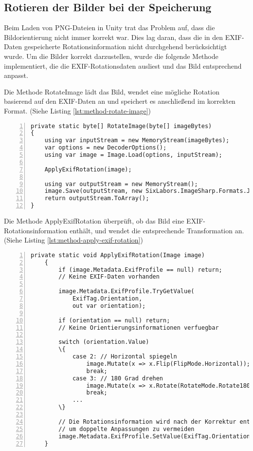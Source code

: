 \subsection{Rotieren der Bilder bei der Speicherung}
\label{subsec:backend-rotate-pictures}

Beim Laden von PNG-Dateien in Unity trat das Problem auf, dass die Bildorientierung 
nicht immer korrekt war. Dies lag daran, dass die in den EXIF-Daten gespeicherte 
Rotationsinformation nicht durchgehend berücksichtigt wurde. Um die Bilder 
korrekt darzustellen, wurde die folgende Methode implementiert, die die 
EXIF-Rotationsdaten ausliest und das Bild entsprechend anpasst.

Die Methode RotateImage lädt das Bild, wendet eine mögliche Rotation 
basierend auf den EXIF-Daten an und speichert es anschlie\ss{}end im korrekten Format. 
(Siehe Listing \ref{lst:method-rotate-image})

\begin{lstlisting}[numbers=left,caption={Methode RotateImage},label={lst:method-rotate-image}]
private static byte[] RotateImage(byte[] imageBytes)
{
    using var inputStream = new MemoryStream(imageBytes);
    var options = new DecoderOptions();
    using var image = Image.Load(options, inputStream);
        
    ApplyExifRotation(image);
    
    using var outputStream = new MemoryStream();
    image.Save(outputStream, new SixLabors.ImageSharp.Formats.Jpeg.JpegEncoder());
    return outputStream.ToArray();
}    
\end{lstlisting}

Die Methode ApplyExifRotation überprüft, ob das Bild eine EXIF-Rotationsinformation enthält, 
und wendet die entsprechende Transformation an. 
(Siehe Listing \ref{lst:method-apply-exif-rotation})

\begin{lstlisting}[numbers=left,caption={Methode ApplyExifRotation},label={lst:method-apply-exif-rotation}]
    private static void ApplyExifRotation(Image image)
    {
        if (image.Metadata.ExifProfile == null) return; 
        // Keine EXIF-Daten vorhanden
                
        image.Metadata.ExifProfile.TryGetValue(
            ExifTag.Orientation, 
            out var orientation);
            
        if (orientation == null) return; 
        // Keine Orientierungsinformationen verfuegbar
            
        switch (orientation.Value)
        \{
            case 2: // Horizontal spiegeln
                image.Mutate(x => x.Flip(FlipMode.Horizontal));
                break;
            case 3: // 180 Grad drehen
                image.Mutate(x => x.Rotate(RotateMode.Rotate180));
                break;
            ...
        \}
            
        // Die Rotationsinformation wird nach der Korrektur entfernt, 
        // um doppelte Anpassungen zu vermeiden
        image.Metadata.ExifProfile.SetValue(ExifTag.Orientation, (ushort)1);
    }    
\end{lstlisting}

